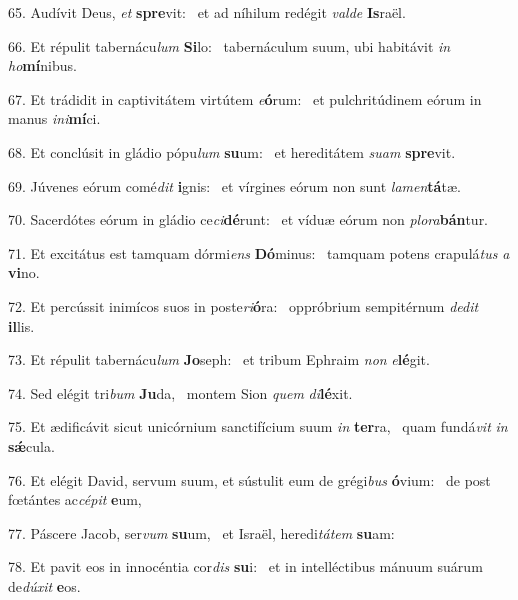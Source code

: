 65. Audívit Deus, \textit{et} \textbf{spre}vit: \ast\  et ad níhilum redégit \textit{val}\textit{de} \textbf{Is}raël.\

66. Et répulit tabernácu\textit{lum} \textbf{Si}lo: \ast\  tabernáculum suum, ubi habitávit \textit{in} \textit{ho}\textbf{mí}nibus.\

67. Et trádidit in captivitátem virtútem \textit{e}\textbf{ó}rum: \ast\  et pulchritúdinem eórum in manus \textit{in}\textit{i}\textbf{mí}ci.\

68. Et conclúsit in gládio pópu\textit{lum} \textbf{su}um: \ast\  et hereditátem \textit{su}\textit{am} \textbf{spre}vit.\

69. Júvenes eórum comé\textit{dit} \textbf{i}gnis: \ast\  et vírgines eórum non sunt \textit{la}\textit{men}\textbf{tá}tæ.\

70. Sacerdótes eórum in gládio ce\textit{ci}\textbf{dé}runt: \ast\  et víduæ eórum non \textit{plo}\textit{ra}\textbf{bán}tur.\

71. Et excitátus est tamquam dórmi\textit{ens} \textbf{Dó}minus: \ast\  tamquam potens crapulá\textit{tus} \textit{a} \textbf{vi}no.\

72. Et percússit inimícos suos in poste\textit{ri}\textbf{ó}ra: \ast\  oppróbrium sempitérnum \textit{de}\textit{dit} \textbf{il}lis.\

73. Et répulit tabernácu\textit{lum} \textbf{Jo}seph: \ast\  et tribum Ephraim \textit{non} \textit{e}\textbf{lé}git.\

74. Sed elégit tri\textit{bum} \textbf{Ju}da, \ast\  montem Sion \textit{quem} \textit{di}\textbf{lé}xit.\

75. Et ædificávit sicut unicórnium sanctifícium suum \textit{in} \textbf{ter}ra, \ast\  quam fundá\textit{vit} \textit{in} \textbf{sǽ}cula.\

76. Et elégit David, servum suum, et sústulit eum de grégi\textit{bus} \textbf{ó}vium: \ast\  de post fœtántes ac\textit{cé}\textit{pit} \textbf{e}um,\

77. Páscere Jacob, ser\textit{vum} \textbf{su}um, \ast\  et Israël, heredi\textit{tá}\textit{tem} \textbf{su}am:\

78. Et pavit eos in innocéntia cor\textit{dis} \textbf{su}i: \ast\  et in intelléctibus mánuum suárum de\textit{dú}\textit{xit} \textbf{e}os.\

